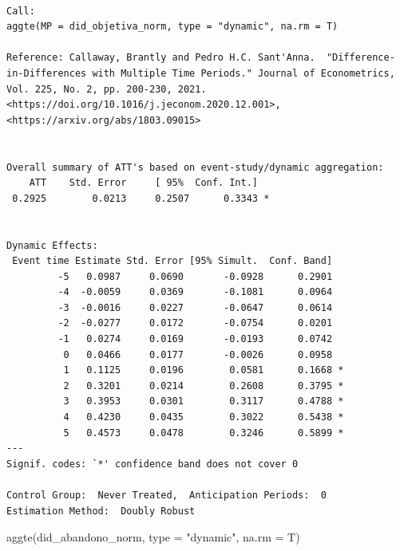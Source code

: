 \documentclass[
  letterpaper,
  DIV=11,
  numbers=noendperiod]{scrartcl}
\newenvironment{Shaded}{\begin{snugshade}}{\end{snugshade}}
\newcommand{\AttributeTok}[1]{\textcolor[rgb]{0.40,0.45,0.13}{#1}}
\newcommand{\FunctionTok}[1]{\textcolor[rgb]{0.28,0.35,0.67}{#1}}
\newcommand{\NormalTok}[1]{\textcolor[rgb]{0.00,0.23,0.31}{#1}}
\newcommand{\StringTok}[1]{\textcolor[rgb]{0.13,0.47,0.30}{#1}}
\begin{document}
\begin{verbatim}

Call:
aggte(MP = did_objetiva_norm, type = "dynamic", na.rm = T)

Reference: Callaway, Brantly and Pedro H.C. Sant'Anna.  "Difference-in-Differences with Multiple Time Periods." Journal of Econometrics, Vol. 225, No. 2, pp. 200-230, 2021. <https://doi.org/10.1016/j.jeconom.2020.12.001>, <https://arxiv.org/abs/1803.09015> 


Overall summary of ATT's based on event-study/dynamic aggregation:  
    ATT    Std. Error     [ 95%  Conf. Int.]  
 0.2925        0.0213     0.2507      0.3343 *


Dynamic Effects:
 Event time Estimate Std. Error [95% Simult.  Conf. Band]  
         -5   0.0987     0.0690       -0.0928      0.2901  
         -4  -0.0059     0.0369       -0.1081      0.0964  
         -3  -0.0016     0.0227       -0.0647      0.0614  
         -2  -0.0277     0.0172       -0.0754      0.0201  
         -1   0.0274     0.0169       -0.0193      0.0742  
          0   0.0466     0.0177       -0.0026      0.0958  
          1   0.1125     0.0196        0.0581      0.1668 *
          2   0.3201     0.0214        0.2608      0.3795 *
          3   0.3953     0.0301        0.3117      0.4788 *
          4   0.4230     0.0435        0.3022      0.5438 *
          5   0.4573     0.0478        0.3246      0.5899 *
---
Signif. codes: `*' confidence band does not cover 0

Control Group:  Never Treated,  Anticipation Periods:  0
Estimation Method:  Doubly Robust
\end{verbatim}

\begin{Shaded}
\begin{Highlighting}[]
\FunctionTok{aggte}\NormalTok{(did\_abandono\_norm, }\AttributeTok{type =} \StringTok{"dynamic"}\NormalTok{, }\AttributeTok{na.rm =}\NormalTok{ T)}
\end{Highlighting}
\end{Shaded}
\end{document}
